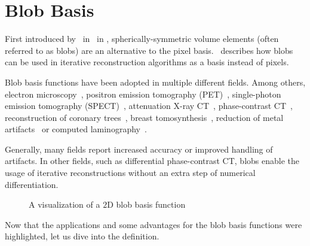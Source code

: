 \section{Blob Basis}\label{sec:blob_basis}

First introduced by~\citeauthor*{lewitt_multidimensional_1990}
in~\cite{lewitt_multidimensional_1990} in \citeyear{lewitt_multidimensional_1990},
spherically-symmetric volume elements (often referred to as blobs) are an alternative to the pixel
basis.~\cite{lewitt_alternatives_1992} describes how blobs can be used in iterative reconstruction
algorithms as a basis instead of pixels.

Blob basis functions have been adopted in multiple different fields. Among others, electron
microscopy~\cite{marabini_3d_1998, garduno_optimization_2001}, positron emission tomography
(PET)~\cite{jacobs_comparative_1999, chlewicki_noise_2004}, single-photon emission tomography
(SPECT)~\cite{wang_3d_2004, yendiki_comparison_2004}, attenuation X-ray
CT~\cite{jacobs_iterative_1999, carvalho_helical_2003, isola_motion-compensated_2008},
phase-contrast CT~\cite{kohler_iterative_2011, xu_investigation_2012}, reconstruction of coronary
trees~\cite{zhou_blob-based_2008}, breast tomosynthesis~\cite{wu_breast_2010}, reduction of metal
artifacts~\cite{levakhina_two-step_2010} or computed laminography~\cite{trampert_spherically_2017}.

Generally, many fields report increased accuracy or improved handling of artifacts. In other fields,
such as differential phase-contrast CT, blobs enable the usage of iterative reconstructions without
an extra step of numerical differentiation.

\begin{figure}
	\caption{A visualization of a \(2\)D blob basis function}\label{fig:blob_basis}
\end{figure}

Now that the applications and some advantages for the blob basis functions were highlighted, let us
dive into the definition.

